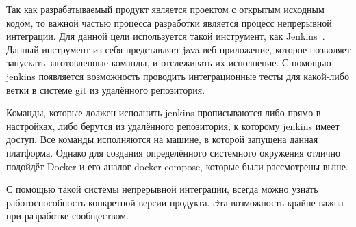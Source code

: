 Так как разрабатываемый продукт является проектом с открытым исходным кодом, то важной частью процесса разработки является процесс непрерывной интеграции.
Для данной цели используется такой инструмент, как Jenkins~\cite{jenkins_documentation}.
Данный инструмент из себя представляет java веб-приложение, которое позволяет запускать заготовленные команды, и отслеживать их исполнение.
С помощью jenkins появляется возможность проводить интеграционные тесты для какой-либо ветки в системе git из удалённого репозитория.

Команды, которые должен исполнить jenkins прописываются либо прямо в настройках, либо берутся из удалённого репозитория, к которому jenkins имеет доступ.
Все команды исполняются на машине, в которой запущена данная платформа.
Однако для создания определённого системного окружения отлично подойдёт Docker и его аналог docker-compose, которые были рассмотрены выше.

С помощью такой системы непрерывной интеграции, всегда можно узнать работоспособность конкретной версии продукта.
Эта возможность крайне важна при разработке сообществом.
